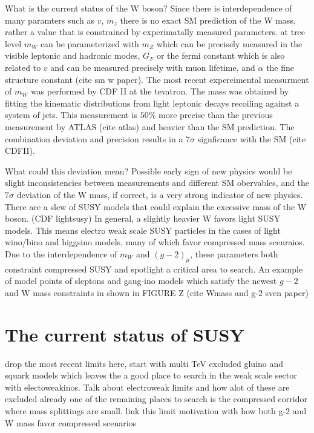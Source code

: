 What is the current status of the W boson?
Since there is interdependence of many paramters such as $v$, $m_z$ there is no exact SM prediction of the W mass, rather a value that is constrained by experimatally measured parameters. at tree level $m_W$ can be parameterized with $m_Z$ which can be precisely measured in the visible leptonic and hadronic modes, $G_F$ or the fermi constant which is also related to $v$ and can be measured precisely with muon lifetime, and $\alpha$ the fine structure constant (cite sm w paper). The most recent expereimental measurment of $m_W$ was performed by CDF II at the tevatron. The mass was obtained by fitting the kinematic distributions from light leptonic decays recoiling against a system of jets. This measurement is $50\%$ more precise than the previous measurement by ATLAS (cite atlas) and heavier than the SM prediction. The combination deviation and precision results in a $7\sigma$ signficance with the SM (cite CDFII).  


What could this deviation mean?
Possible early sign of new physics would be slight inconsistencies between measurements and different SM obervables, and the $7\sigma$ deviation of the W mass, if correct, is a very strong indicator of new physics. There are a slew of SUSY models that could explain the excessive mass of the W boson. (CDF lightsusy) In general, a slightly heavier W favors light SUSY models. This means electro weak scale SUSY particles in the cases of light wino/bino and higgsino models, many of which favor compressed mass scenraios. Due to the interdependence of $m_W$ and $(g-2)_\mu$, these parameters both constraint compressed SUSY and spotlight a critical area to search. An example of model points of sleptons and gaug-ino models which satisfy the newest $g-2$ and W mass constraints in shown in FIGURE Z (cite Wmass and g-2 sven paper)


\section{The current status of SUSY}
drop the most recent limits here, start with multi TeV excluded gluino and squark models which leaves the a good place to search in the weak scale sector with electoweakinos. Talk about electroweak limits and how alot of these are excluded already one of the remaining places to search is the compressed corridor where mass splittings are small. link this limit motivation with how both g-2 and W mass favor compressed scenarios

